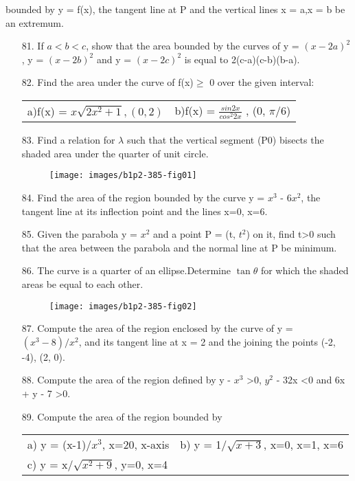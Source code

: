 \documentclass[11pt]{amsbook}
\begin{document}
bounded by y = f(x), the tangent line at P and the vertical lines x = a,x = b be an extremum.

\begin{enumerate}

\item[81.]
If $a<b<c$, show that the area bounded by the curves of y = $(x-2a)^2$, y = $(x-2b)^2$ and y = $(x-2c)^2$ is equal to 2(c-a)(c-b)(b-a).
\item[82.]
Find the area under the curve of f(x)$\geq$ 0 over the given interval:

\begin{tabular}{ll}
a)f(x) = $x\sqrt{2x^2+1}, (0, 2)$
&b)f(x) = $\frac{sin 2x}{cos^2 2x}$ , (0, $\pi$/6)
\end{tabular}

\item[83.]
Find a relation for $\lambda$ such that the vertical segment (P0) bisects the shaded area under the quarter of unit circle.

\begin{figure}[htb]
\begin{center}
\texttt{[image: images/b1p2-385-fig01]}
\end{center}
\end{figure}

\item[84.]
Find the area of the region bounded by the curve y = $x^3$ - $6x^2$, the tangent line at its inflection point and the lines x=0, x=6.
\item[85.]
Given the parabola y = $x^2$ and a point P = (t, $t^2$) on it, find t\textgreater0 such that the area between the parabola and the normal line at P be minimum.

\item[86.]
The curve is a quarter of an ellipse.Determine $\tan\theta$ 
for which the shaded areas be equal to each other.

\begin{figure}[htb]
\begin{center}
\texttt{[image: images/b1p2-385-fig02]}
\end{center}
\end{figure}

\item[87.]
Compute the area of the region enclosed by the curve of
y = $(x^3-8)/x^2$, and its tangent line at x = 2 and the joining
the points (-2, -4), (2, 0).
\item[88.]
Compute the area of the region defined by y - $x^3$ \textgreater 0, $y^2$ - 32x \textless 0 and 6x + y - 7 \textgreater 0.
\item[89.]
Compute the area of the region bounded by

\begin{tabular}{ll}
a) y = (x-1)/$x^3$, x=20, x-axis 
&b) y = 1/$\sqrt{x+3}$, x=0, x=1, x=6\\
c) y = x/$\sqrt{x^2+9}$, y=0, x=4
\end{tabular}
\end{enumerate}
\end{document}

